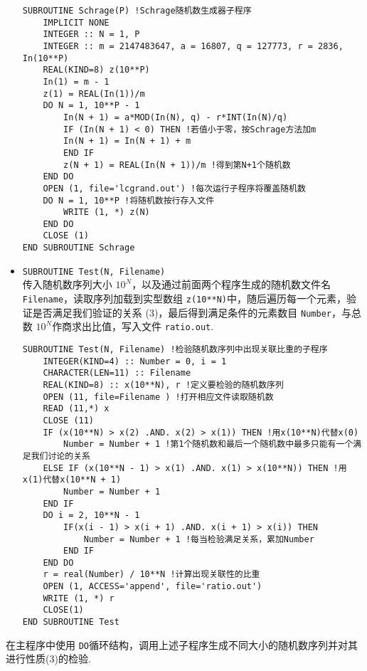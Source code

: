 \documentclass[qpt,a4paper,utf8]{ctexart}
\begin{document}
\begin{itemize}
\begin{framed}
\begin{lstlisting}[frame=trBL]
SUBROUTINE Schrage(P) !Schrage随机数生成器子程序
    IMPLICIT NONE
    INTEGER :: N = 1, P
    INTEGER :: m = 2147483647, a = 16807, q = 127773, r = 2836, In(10**P)
    REAL(KIND=8) z(10**P)
    In(1) = m - 1
    z(1) = REAL(In(1))/m
    DO N = 1, 10**P - 1
        In(N + 1) = a*MOD(In(N), q) - r*INT(In(N)/q)
        IF (In(N + 1) < 0) THEN !若值小于零，按Schrage方法加m
        In(N + 1) = In(N + 1) + m
        END IF
        z(N + 1) = REAL(In(N + 1))/m !得到第N+1个随机数
    END DO
    OPEN (1, file='lcgrand.out') !每次运行子程序将覆盖随机数
    DO N = 1, 10**P !将随机数按行存入文件
        WRITE (1, *) z(N)
    END DO
    CLOSE (1)
END SUBROUTINE Schrage
\end{lstlisting}
\end{framed}
    
\item \texttt{SUBROUTINE Test(N, Filename)}\\
传入随机数序列大小 $10^N$，以及通过前面两个程序生成的随机数文件名
\texttt{Filename}，读取序列加载到实型数组
\texttt{z(10**N)}中，随后遍历每一个元素，验证是否满足我们验证的关系
(3)，最后得到满足条件的元素数目 \texttt{Number}，与总数
$10^N$作商求出比值，写入文件 \texttt{ratio.out}.
\begin{framed}
\begin{lstlisting}[frame=trBL]
SUBROUTINE Test(N, Filename) !检验随机数序列中出现关联比重的子程序
    INTEGER(KIND=4) :: Number = 0, i = 1
    CHARACTER(LEN=11) :: Filename
    REAL(KIND=8) :: x(10**N), r !定义要检验的随机数序列
    OPEN (11, file=Filename ) !打开相应文件读取随机数
    READ (11,*) x
    CLOSE (11)
    IF (x(10**N) > x(2) .AND. x(2) > x(1)) THEN !用x(10**N)代替x(0)
        Number = Number + 1 !第1个随机数和最后一个随机数中最多只能有一个满足我们讨论的关系
    ELSE IF (x(10**N - 1) > x(1) .AND. x(1) > x(10**N)) THEN !用x(1)代替x(10**N + 1)
        Number = Number + 1
    END IF
    DO i = 2, 10**N - 1
        IF(x(i - 1) > x(i + 1) .AND. x(i + 1) > x(i)) THEN
            Number = Number + 1 !每当检验满足关系，累加Number
        END IF
    END DO
    r = real(Number) / 10**N !计算出现关联性的比重
    OPEN (1, ACCESS='append', file='ratio.out')
    WRITE (1, *) r
    CLOSE(1)
END SUBROUTINE Test
\end{lstlisting}
\end{framed}
\end{itemize}
\newpage
在主程序中使用
\texttt{DO}循环结构，调用上述子程序生成不同大小的随机数序列并对其进行性质(3)的检验.
\end{document}
